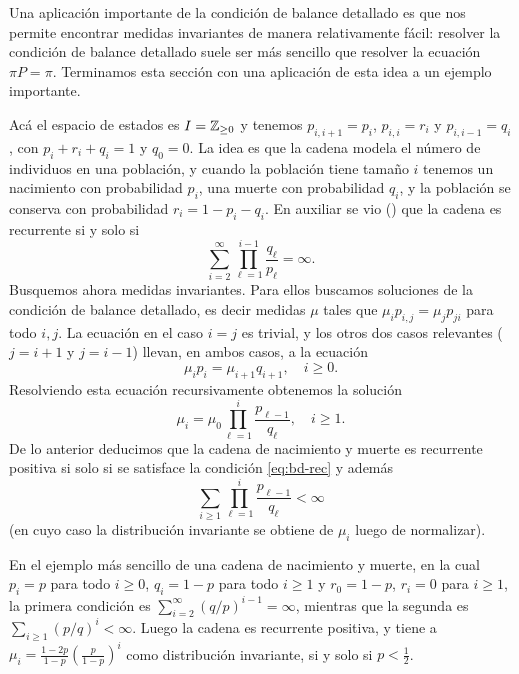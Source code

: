 Una aplicación importante de la condición de balance detallado es que nos permite encontrar medidas invariantes de manera relativamente fácil: resolver la condición de balance detallado suele ser más sencillo que resolver la ecuación $\pi P=\pi$.
Terminamos esta sección con una aplicación de esta idea a un ejemplo importante.

\begin{ex}
Acá el espacio de estados es $I=\mathbb{Z}_{\geq0}$ y tenemos $p_{i,i+1}=p_i$, $p_{i,i}=r_i$ y $p_{i,i-1}=q_i$, con $p_i+r_i+q_i=1$ y $q_0=0$.
La idea es que la cadena modela el número de individuos en una población, y cuando la población tiene tamaño $i$ tenemos un nacimiento con probabilidad $p_i$, una muerte con probabilidad $q_i$, y la población se conserva con probabilidad $r_i=1-p_i-q_i$.
En auxiliar se vio (\ucmark) que la cadena es recurrente si y solo si
\begin{equation}
\sum_{i=2}^{\infty}\prod_{\ell=1}^{i-1}\frac{q_\ell}{p_\ell}=\infty.\label{eq:bd-rec}
\end{equation}
Busquemos ahora medidas invariantes.
Para ellos buscamos soluciones de la condición de balance detallado, es decir medidas $\mu$ tales que $\mu_ip_{i,j}=\mu_jp_{ji}$ para todo $i,j$.
La ecuación en el caso $i=j$ es trivial, y los otros dos casos relevantes ($j=i+1$ y $j=i-1$) llevan, en ambos casos, a la ecuación
\[\mu_ip_i=\mu_{i+1}q_{i+1},\quad i\geq0.\]
Resolviendo esta ecuación recursivamente obtenemos la solución
\[\mu_i=\mu_0\prod_{\ell=1}^i\frac{p_{\ell-1}}{q_\ell},\quad i\geq1.\]
De lo anterior deducimos que la cadena de nacimiento y muerte es recurrente positiva si solo si se satisface la condición \eqref{eq:bd-rec} y además
\[\sum_{i\geq1}\prod_{\ell=1}^i\frac{p_{\ell-1}}{q_\ell}<\infty\]
(en cuyo caso la distribución invariante se obtiene de $\mu_i$ luego de normalizar).

\noindent En el ejemplo más sencillo de una cadena de nacimiento y muerte, en la cual $p_i=p$ para todo $i\geq0$, $q_i=1-p$ para todo $i\geq1$ y $r_0=1-p$, $r_i=0$ para $i\geq1$, la primera condición es $\sum_{i=2}^{\infty}(q/p)^{i-1}=\infty$, mientras que la segunda es $\sum_{i\geq1}(p/q)^i<\infty$.
Luego la cadena es recurrente positiva, y tiene a $\mu_i=\frac{1-2p}{1-p}\left(\frac{p}{1-p}\right)^i$ como distribución invariante, si y solo si $p<\frac12$.
\end{ex}

